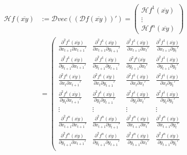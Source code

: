 \documentclass{article}
\begin{document}
\begin{align*}
  \mathcal{H} f(\overline{xy}) &:= \mathcal{D} vec((\mathcal{D} f(\overline{xy}))')
    = \begin{pmatrix}
    \mathcal{H}f^1(\overline{xy})\\\vdots\\    \mathcal{H}f^n(\overline{xy})
  \end{pmatrix}\\
  &=
  \left(
  \begin{array}{cccc}
    \frac{\partial^2 f^1(\overline{xy})}{\partial {x_{t+1}}\partial {x_{t+1}}'} & \frac{\partial^2 f^1(\overline{xy})}{\partial {x_{t+1}}\partial {y_{t+1}}'}&
    \frac{\partial^2 f^1(\overline{xy})}{\partial {x_{t+1}}\partial {x_{t}}'} & \frac{\partial^2 f^1(\overline{xy})}{\partial {x_{t+1}}\partial {y_{t}}'}\\
    \frac{\partial^2 f^1(\overline{xy})}{\partial {y_{t+1}}\partial {x_{t+1}}'} & \frac{\partial^2 f^1(\overline{xy})}{\partial {y_{t+1}}\partial {y_{t+1}}'}&
    \frac{\partial^2 f^1(\overline{xy}}{\partial {y_{t+1}}\partial {x_{t}}'} & \frac{\partial^2 f^1(\overline{xy})}{\partial {y_{t+1}}\partial {y_{t}}'}\\
    \frac{\partial^2 f^1(\overline{xy})}{\partial {x_{t}}\partial {x_{t+1}}'} & \frac{\partial^2 f^1(\overline{xy})}{\partial {x_{t}}\partial {y_{t+1}}'}&
    \frac{\partial^2 f^1(\overline{xy})}{\partial {x_{t}}\partial {x_{t}}'} & \frac{\partial^2 f^1(\overline{xy})}{\partial {x_{t}}\partial {y_{t}}'}\\
    \frac{\partial^2 f^1(\overline{xy})}{\partial {y_{t}}\partial {x_{t+1}}'} & \frac{\partial^2 f^1(\overline{xy})}{\partial {y_{t}}\partial {y_{t+1}}'}&
    \frac{\partial^2 f^1(\overline{xy})}{\partial {y_{t}}\partial {x_{t}}'} & \frac{\partial^2 f^1(\overline{xy})}{\partial {y_{t}}\partial {y_{t}}'}\\
    \vdots & \vdots & \vdots & \vdots\\
    \frac{\partial^2 f^n(\overline{xy})}{\partial {x_{t+1}}\partial {x_{t+1}}'} & \frac{\partial^2 f^n(\overline{xy})}{\partial {x_{t+1}}\partial {y_{t+1}}'}&
    \frac{\partial^2 f^n(\overline{xy})}{\partial {x_{t+1}}\partial {x_{t}}'} & \frac{\partial^2 f^n(\overline{xy})}{\partial {x_{t+1}}\partial {y_{t}}'}\\
    \frac{\partial^2 f^n(\overline{xy})}{\partial {y_{t+1}}\partial {x_{t+1}}'} & \frac{\partial^2 f^n(\overline{xy})}{\partial {y_{t+1}}\partial {y_{t+1}}'}&
    \frac{\partial^2 f^n(\overline{xy})}{\partial {y_{t+1}}\partial {x_{t}}'} & \frac{\partial^2 f^n(\overline{xy})}{\partial {y_{t+1}}\partial {y_{t}}'}\\

\end{array}
\end{align*}
\end{document}
